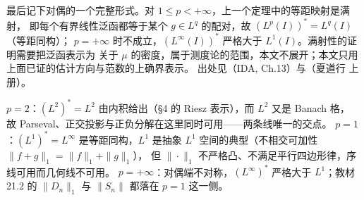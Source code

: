 \documentclass[oneside]{book}
\theoremstyle{definition}
\theoremstyle{definition}
\begin{document}
	最后记下对偶的一个完整形式。对 $1\leqslant p<+\infty$，上一个定理中的等距映射是满射，
	即每个有界线性泛函都等于某个 $g\in L^q$ 的配对，故 $(L^p(I))^*=L^q(I)$（等距同构）；
	$p=+\infty$ 时不成立，$(L^\infty(I))^*$ 严格大于 $L^1(I)$。满射性的证明需要把泛函表示为
	关于 $\mu$ 的密度，属于测度论的范围，本文不展开；本文只用上面已证的估计方向与范数的上确界表示。
	出处见（IDA, Ch.13）与（夏道行 上册）。
	
	\begin{link}[$p=1$、$p=2$、$p=+\infty$ 三点在两条线上的位置]
		$p=2$：$(L^2)^*=L^2$ 由内积给出（§4 的 Riesz 表示），而 $L^2$ 又是 Banach 格，
		故 Parseval、正交投影与正负分解在这里同时可用——两条线唯一的交点。
		$p=1$：$(L^1)^*=L^\infty$ 是等距同构，$L^1$ 是抽象 $L^1$ 空间的典型（不相交可加性 $\|f+g\|_1=\|f\|_1+\|g\|_1$），
		但 $\|\cdot\|_1$ 不严格凸、不满足平行四边形律，序线可用而几何线不可用。
		$p=+\infty$：对偶端不对称，$(L^\infty)^*$ 严格大于 $L^1$；教材 21.2 的 $\|D_n\|_1$ 与 $\|S_n\|$ 都落在 $p=1$ 这一侧。
	\end{link}
	
	
	
	
	
	
\end{document}
